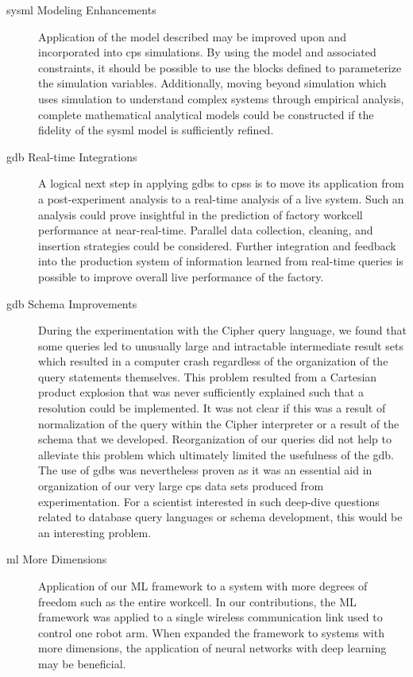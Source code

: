 \begin{description}
	
	\item[\Gls{sysml} Modeling Enhancements] Application of the model described may be improved upon and incorporated into \gls{cps} simulations.  By using the model and associated constraints, it should be possible to use the blocks defined to parameterize the simulation variables.  Additionally, moving beyond simulation which uses simulation to understand complex systems through empirical analysis, complete mathematical analytical models could be constructed if the fidelity of the \gls{sysml} model is sufficiently refined.
	
	\item[\Gls{gdb} Real-time Integrations] A logical next step in applying \glspl{gdb} to \glspl{cps} is to move its application from a post-experiment analysis to a real-time analysis of a live system.  Such an analysis could prove insightful in the prediction of factory workcell performance at near-real-time.  Parallel data collection, cleaning, and insertion strategies could be considered. Further integration and feedback into the production system of information learned from real-time queries is possible to improve overall live performance of the factory.
	
	\item[\Gls{gdb} Schema Improvements] During the experimentation with the Cipher query language, we found that some queries led to unusually large and intractable intermediate result sets which resulted in a computer crash regardless of the organization of the query statements themselves.  This problem resulted from a Cartesian product explosion that was never sufficiently explained such that a resolution could be implemented.  It was not clear if this was a result of normalization of the query within the Cipher interpreter or a result of the schema that we developed.  Reorganization of our queries did not help to alleviate this problem which ultimately limited the usefulness of the \gls{gdb}.  The use of \glspl{gdb} was nevertheless proven as it was an essential aid in organization of our very large \gls{cps} data sets produced from experimentation.  For a scientist interested in such deep-dive questions related to database query languages or schema development, this would be an interesting problem.
	
	\item[\Gls{ml} More Dimensions] Application of our ML framework to a system with more degrees of freedom such as the entire workcell.  In our contributions, the ML framework was applied to a single wireless communication link used to control one robot arm.  When expanded the framework to systems with more dimensions, the application of neural networks with deep learning may be beneficial.
	

\end{description}
